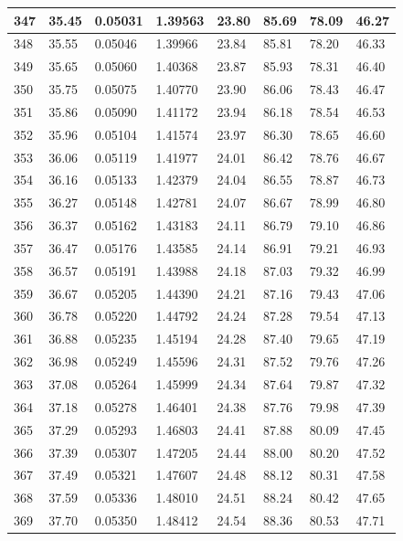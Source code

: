 \documentclass[12pt,a4paper,twoside]{article}
\begin{document}
\begin{center}
\begin{longtable}{l l l l | l l l l}
347 & 35.45 & 0.05031 & 1.39563 & 23.80 & 85.69 & 78.09 & 46.27 \\ \hline
348 & 35.55 & 0.05046 & 1.39966 & 23.84 & 85.81 & 78.20 & 46.33 \\ \hline
349 & 35.65 & 0.05060 & 1.40368 & 23.87 & 85.93 & 78.31 & 46.40 \\ \hline
350 & 35.75 & 0.05075 & 1.40770 & 23.90 & 86.06 & 78.43 & 46.47 \\ \hline
351 & 35.86 & 0.05090 & 1.41172 & 23.94 & 86.18 & 78.54 & 46.53 \\ \hline
352 & 35.96 & 0.05104 & 1.41574 & 23.97 & 86.30 & 78.65 & 46.60 \\ \hline
353 & 36.06 & 0.05119 & 1.41977 & 24.01 & 86.42 & 78.76 & 46.67 \\ \hline
354 & 36.16 & 0.05133 & 1.42379 & 24.04 & 86.55 & 78.87 & 46.73 \\ \hline
355 & 36.27 & 0.05148 & 1.42781 & 24.07 & 86.67 & 78.99 & 46.80 \\ \hline
356 & 36.37 & 0.05162 & 1.43183 & 24.11 & 86.79 & 79.10 & 46.86 \\ \hline
357 & 36.47 & 0.05176 & 1.43585 & 24.14 & 86.91 & 79.21 & 46.93 \\ \hline
358 & 36.57 & 0.05191 & 1.43988 & 24.18 & 87.03 & 79.32 & 46.99 \\ \hline
359 & 36.67 & 0.05205 & 1.44390 & 24.21 & 87.16 & 79.43 & 47.06 \\ \hline
360 & 36.78 & 0.05220 & 1.44792 & 24.24 & 87.28 & 79.54 & 47.13 \\ \hline
361 & 36.88 & 0.05235 & 1.45194 & 24.28 & 87.40 & 79.65 & 47.19 \\ \hline
362 & 36.98 & 0.05249 & 1.45596 & 24.31 & 87.52 & 79.76 & 47.26 \\ \hline
363 & 37.08 & 0.05264 & 1.45999 & 24.34 & 87.64 & 79.87 & 47.32 \\ \hline
364 & 37.18 & 0.05278 & 1.46401 & 24.38 & 87.76 & 79.98 & 47.39 \\ \hline
365 & 37.29 & 0.05293 & 1.46803 & 24.41 & 87.88 & 80.09 & 47.45 \\ \hline
366 & 37.39 & 0.05307 & 1.47205 & 24.44 & 88.00 & 80.20 & 47.52 \\ \hline
367 & 37.49 & 0.05321 & 1.47607 & 24.48 & 88.12 & 80.31 & 47.58 \\ \hline
368 & 37.59 & 0.05336 & 1.48010 & 24.51 & 88.24 & 80.42 & 47.65 \\ \hline
369 & 37.70 & 0.05350 & 1.48412 & 24.54 & 88.36 & 80.53 & 47.71 \\ \hline

\end{longtable}
\end{center}
\end{document}
